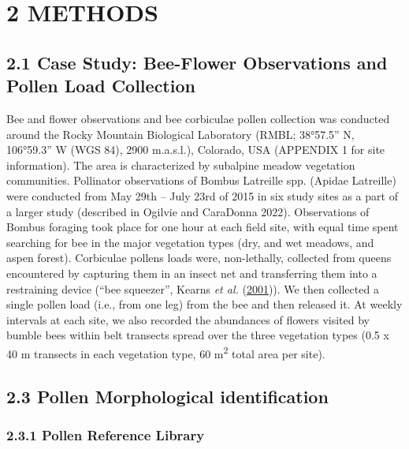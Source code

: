 \documentclass[
]{article}
\begin{document}
\hypertarget{methods}{%
\section{2 \textbar{} METHODS}\label{methods}}

\hypertarget{case-study-bee-flower-observations-and-pollen-load-collection}{%
\subsection{2.1 Case Study: Bee-Flower Observations and Pollen Load
Collection}\label{case-study-bee-flower-observations-and-pollen-load-collection}}

Bee and flower observations and bee corbiculae pollen collection was
conducted around the Rocky Mountain Biological Laboratory (RMBL;
38°57.5'' N, 106°59.3'' W (WGS 84), 2900 m.a.s.l.), Colorado, USA
(APPENDIX 1 for site information). The area is characterized by
subalpine meadow vegetation communities. Pollinator observations of
Bombus Latreille spp. (Apidae Latreille) were conducted from May 29th --
July 23rd of 2015 in six study sites as a part of a larger study
(described in Ogilvie and CaraDonna 2022). Observations of Bombus
foraging took place for one hour at each field site, with equal time
spent searching for bee in the major vegetation types (dry, and wet
meadows, and aspen forest). Corbiculae pollens loads were, non-lethally,
collected from queens encountered by capturing them in an insect net and
transferring them into a restraining device (``bee squeezer'', Kearns
\emph{et al.} (\protect\hyperlink{ref-kearns2001natural}{2001})). We
then collected a single pollen load (i.e., from one leg) from the bee
and then released it. At weekly intervals at each site, we also recorded
the abundances of flowers visited by bumble bees within belt transects
spread over the three vegetation types (0.5 x 40 m transects in each
vegetation type, 60 m\textsuperscript{2} total area per site).

\hypertarget{pollen-morphological-identification}{%
\subsection{2.3 \textbar{} Pollen Morphological
identification}\label{pollen-morphological-identification}}

\hypertarget{pollen-reference-library}{%
\subsubsection{2.3.1 \textbar{} Pollen Reference
Library}\label{pollen-reference-library}}
\end{document}
